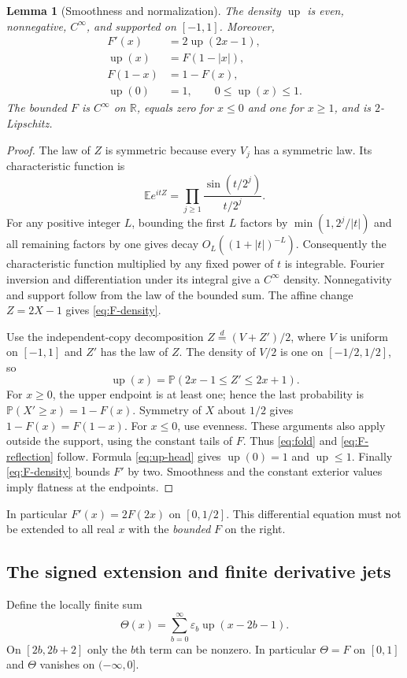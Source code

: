 \documentclass[11pt,a4paper]{article}
\numberwithin{equation}{section}
\newtheorem{lemma}[theorem]{Lemma}
\theoremstyle{definition}
\theoremstyle{remark}
\newcommand{\up}{\operatorname{up}}
\newcommand{\E}{\mathbb E}
\newcommand{\Pp}{\mathbb P}
\newcommand{\R}{\mathbb R}
\newcommand{\eps}{\varepsilon}
\begin{document}
\begin{lemma}[Smoothness and normalization]
\label{lem:normalization}
The density $\up$ is even, nonnegative, $C^\infty$, and supported on $[-1,1]$. Moreover,
\begin{align}
 F'(x)&=2\up(2x-1),\label{eq:F-density}\\
 \up(x)&=F(1-|x|),\label{eq:fold}\\
 F(1-x)&=1-F(x),\label{eq:F-reflection}\\
 \up(0)&=1,\qquad 0\le\up(x)\le1.\label{eq:up-bound}
\end{align}
The bounded $F$ is $C^\infty$ on $\R$, equals zero for $x\le0$ and one for $x\ge1$, and is $2$-Lipschitz.
\end{lemma}
\begin{proof}
The law of $Z$ is symmetric because every $V_j$ has a symmetric law. Its characteristic function is
\[
 \E e^{itZ}=\prod_{j\ge1}\frac{\sin(t/2^j)}{t/2^j}.
\]
For any positive integer $L$, bounding the first $L$ factors by $\min(1,2^j/|t|)$ and all remaining factors by one gives decay $O_L((1+|t|)^{-L})$. Consequently the characteristic function multiplied by any fixed power of $t$ is integrable. Fourier inversion and differentiation under its integral give a $C^\infty$ density. Nonnegativity and support follow from the law of the bounded sum. The affine change $Z=2X-1$ gives \cref{eq:F-density}.

Use the independent-copy decomposition $Z\overset d=(V+Z')/2$, where $V$ is uniform on $[-1,1]$ and $Z'$ has the law of $Z$. The density of $V/2$ is one on $[-1/2,1/2]$, so
\begin{equation}
 \up(x)=\Pp(2x-1\le Z'\le2x+1).
 \label{eq:up-head}
\end{equation}
For $x\ge0$, the upper endpoint is at least one; hence the last probability is $\Pp(X'\ge x)=1-F(x)$. Symmetry of $X$ about $1/2$ gives $1-F(x)=F(1-x)$. For $x\le0$, use evenness. These arguments also apply outside the support, using the constant tails of $F$. Thus \cref{eq:fold} and \cref{eq:F-reflection} follow. Formula \cref{eq:up-head} gives $\up(0)=1$ and $\up\le1$. Finally \cref{eq:F-density} bounds $F'$ by two. Smoothness and the constant exterior values imply flatness at the endpoints.
\end{proof}
In particular $F'(x)=2F(2x)$ on $[0,1/2]$. This differential equation must not be extended to all real $x$ with the \emph{bounded} $F$ on the right.

\subsection{The signed extension and finite derivative jets}
Define the locally finite sum
\begin{equation}
 \Theta(x)=\sum_{b=0}^{\infty}\eps_b\up(x-2b-1).
 \label{eq:Theta}
\end{equation}
On $[2b,2b+2]$ only the $b$th term can be nonzero. In particular $\Theta=F$ on $[0,1]$ and $\Theta$ vanishes on $(-\infty,0]$.
\end{document}
